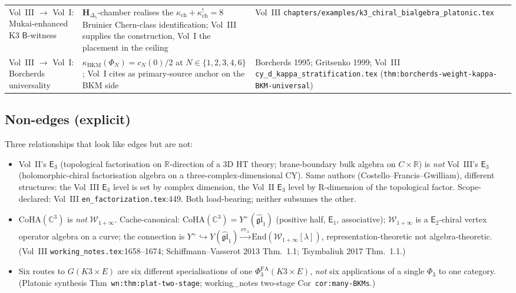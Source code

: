 \documentclass[11pt]{article}
\theoremstyle{definition}
\theoremstyle{remark}
\providecommand{\C}{\mathbb{C}}
\providecommand{\R}{\mathbb{R}}
\providecommand{\fgl}{\mathfrak{gl}}
\providecommand{\Phifa}{\Phi^{\mathrm{FA}}}
\providecommand{\Eone}{\mathsf{E}_1}
\providecommand{\Etwo}{\mathsf{E}_2}
\providecommand{\Ethree}{\mathsf{E}_3}
\providecommand{\kch}{\kappa_{\mathrm{ch}}}
\providecommand{\kBKM}{\kappa_{\mathrm{BKM}}}
\providecommand{\CoHA}{\mathrm{CoHA}}
\providecommand{\Winf}{\mathcal{W}_{1+\infty}}
\providecommand{\Yplus}{Y^{+}}
\providecommand{\Yhat}{Y(\widehat{\fgl}_1)}
\begin{document}
\begin{longtable}{@{}p{4.5cm}p{5.5cm}p{4.5cm}@{}}
Vol~III $\to$ Vol~I: Mukai-enhanced K3 $\mathsf{B}$-witness
& $\mathbf{H}_{\Delta_5}$-chamber realises the $\kch+\kch^! = 8$
Bruinier Chern-class identification; Vol~III supplies the construction,
Vol~I the placement in the ceiling
& Vol~III
\texttt{chapters/examples/k3\_chiral\_bialgebra\_platonic.tex}
\\[0.3ex]

Vol~III $\to$ Vol~I: Borcherds universality
& $\kBKM(\Phi_N) = c_N(0)/2$ at $N\in\{1,2,3,4,6\}$; Vol~I cites as
primary-source anchor on the BKM side
& Borcherds 1995; Gritsenko 1999; Vol~III
\texttt{cy\_d\_kappa\_stratification.tex}
(\texttt{thm:borcherds-weight-kappa-BKM-universal})
\\
\bottomrule
\end{longtable}

\subsection{Non-edges (explicit)}

Three relationships that look like edges but are not:

\begin{itemize}[leftmargin=1.5em]
\item Vol~II's $\Ethree$ (topological factorisation on $\R$-direction
of a 3D HT theory; brane-boundary bulk algebra on $C\times\R$) is
\emph{not} Vol~III's $\Ethree$ (holomorphic-chiral factorisation
algebra on a three-complex-dimensional CY). Same authors
(Costello--Francis--Gwilliam), different structures: the Vol~III
$\Ethree$ level is set by complex dimension, the Vol~II $\Ethree$
level by R-dimension of the topological factor.
Scope-declared: Vol~III \texttt{en\_factorization.tex}:449. Both
load-bearing; neither subsumes the other.
\item $\CoHA(\C^3)$ is \emph{not} $\Winf$. Cache-canonical:
$\CoHA(\C^3) = \Yplus(\widehat{\fgl}_1)$ (positive half, $\Eone$,
associative); $\Winf$ is a $\Etwo$-chiral vertex operator algebra on
a curve; the connection is $\Yplus\hookrightarrow\Yhat
\xrightarrow{\mathrm{ev}_\lambda}\mathrm{End}(\Winf[\lambda])$,
representation-theoretic not algebra-theoretic. (Vol~III
\texttt{working\_notes.tex}:1658--1674; Schiffmann--Vasserot 2013
Thm.~1.1; Tsymbaliuk 2017 Thm.~1.1.)
\item Six routes to $G(K3\times E)$ are six different specialisations
of one $\Phifa_3(K3\times E)$, \emph{not} six applications of a single
$\Phi_3$ to one category. (Platonic synthesis
Thm~\texttt{wn:thm:plat-two-stage}; working\_notes two-stage
Cor~\texttt{cor:many-BKMs}.)
\end{itemize}
\end{document}
